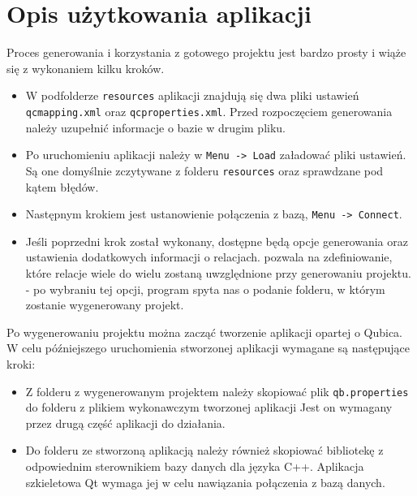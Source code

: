 \documentclass[12pt]{report}
\let\oldaddcontentsline\addcontentsline
\newcommand{\lstinputcplusplus}[2][]{{%
  \renewcommand{\lstlistingname}{C++ Code}%
  \renewcommand{\addcontentsline}[3]{\oldaddcontentsline{loc}{##2}{##3}}%
}}
\begin{document}
\begin{framed}
\lstinputcplusplus[caption={QcFileGenerator}]{additional/qcfilegenerator.h}
\end{framed}

\section{Opis użytkowania aplikacji}

Proces generowania i korzystania z gotowego projektu jest bardzo prosty i wiąże się z wykonaniem kilku kroków.

\begin{itemize}
\item W podfolderze {\tt resources} aplikacji znajdują się dwa pliki ustawień \\{\tt qcmapping.xml} oraz {\tt qcproperties.xml}. Przed rozpoczęciem generowania należy uzupełnić informacje o bazie w drugim pliku.
\item Po uruchomieniu aplikacji należy w {\tt Menu -> Load} załadować pliki ustawień. Są one domyślnie zczytywane z folderu {\tt resources} oraz sprawdzane pod kątem błędów.
\item Następnym krokiem jest ustanowienie połączenia z bazą, {\tt Menu -> Connect}. 
\item Jeśli poprzedni krok został wykonany, dostępne będą opcje generowania oraz ustawienia dodatkowych informacji o relacjach.
 pozwala na zdefiniowanie, które relacje wiele do wielu zostaną uwzględnione przy generowaniu projektu.
 - po wybraniu tej opcji, program spyta nas o podanie folderu, w którym zostanie wygenerowany projekt.
\end{itemize}

Po wygenerowaniu projektu można zacząć tworzenie aplikacji opartej o Qubica. W celu późniejszego uruchomienia stworzonej aplikacji wymagane są następujące kroki:

\begin{itemize}
\item Z folderu z wygenerowanym projektem należy skopiować plik {\tt qb.proper\-ties} do folderu z plikiem wykonawczym tworzonej aplikacji {\color{black} Jest on wymagany przez drugą część aplikacji do działania.}
\item Do folderu ze stworzoną aplikacją należy również skopiować bibliotekę z odpowiednim sterownikiem bazy danych dla języka C++. {\color{black} Aplikacja szkieletowa Qt wymaga jej w celu nawiązania połączenia z bazą danych.}
\end{itemize}
\end{document}
